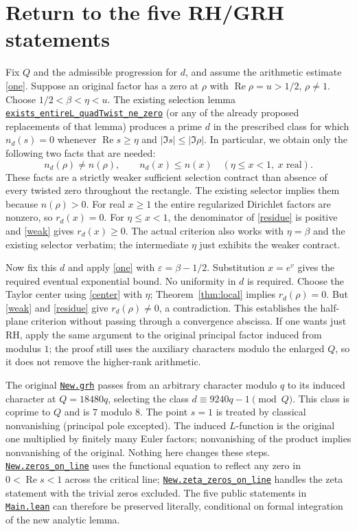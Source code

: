 \documentclass[11pt]{article}
\theoremstyle{remark}\newtheorem{remark}[theorem]{Remark}
\newcommand{\Rea}{\operatorname{Re}}\newcommand{\abs}[1]{\left|#1\right|}
\newcommand{\repo}{https://github.com/VladimirReshetnikov/ProveIt/blob/ef7d441dcb37ea944b7ac15731bb766f2e1354ea/Analysis/GeneralizedRiemannHypothesis/}
\newcommand{\src}[3]{\href{\repo Lean/grh/src/#1.lean\#L#2}{#3}}
\begin{document}
\section{Return to the five RH/GRH statements}\label{sec:grh}
Fix $Q$ and the admissible progression for $d$, and assume the arithmetic estimate \eqref{one}. Suppose an original factor has a zero at $\rho$ with $\Rea\rho=u>1/2$, $\rho\ne1$. Choose $1/2<\beta<\eta<u$. The existing selection lemma \src{Lib/Analytic/QuadraticTwist}{796}{\texttt{exists\_entireL\_quadTwist\_ne\_zero}} (or any of the already proposed replacements of that lemma) produces a prime $d$ in the prescribed class for which $n_d(s)=0$ whenever $\Rea s\ge\eta$ and $|\Im s|\le |\Im\rho|$. In particular, we obtain only the following two facts that are needed:
\begin{equation}\label{weak}
 \boxed{\quad n_d(\rho)\ne n(\rho),\qquad n_d(x)\le n(x)\quad (\eta\le x<1,\ x\text{ real}).\quad}
\end{equation}
These facts are a strictly weaker sufficient selection contract than absence of every twisted zero throughout the rectangle. The existing selector implies them because $n(\rho)>0$. For real $x\ge1$ the entire regularized Dirichlet factors are nonzero, so $r_d(x)=0$. For $\eta\le x<1$, the denominator of \eqref{residue} is positive and \eqref{weak} gives $r_d(x)\ge0$. The actual criterion also works with $\eta=\beta$ and the existing selector verbatim; the intermediate $\eta$ just exhibits the weaker contract.

Now fix this $d$ and apply \eqref{one} with $\varepsilon=\beta-1/2$. Substitution $x=e^v$ gives the required eventual exponential bound. No uniformity in $d$ is required. Choose the Taylor center using \eqref{center} with $\eta$; Theorem~\ref{thm:local} implies $r_d(\rho)=0$. But \eqref{weak} and \eqref{residue} give $r_d(\rho)\ne0$, a contradiction. This establishes the half-plane criterion without passing through a convergence abscissa. If one wants just RH, apply the same argument to the original principal factor induced from modulus $1$; the proof still uses the auxiliary characters modulo the enlarged $Q$, so it does not remove the higher-rank arithmetic.

The original \src{New/Reduction/OneSidedBound}{239}{\texttt{New.grh}} passes from an arbitrary character modulo $q$ to its induced character at $Q=18480q$, selecting the class $d\equiv9240q-1\pmod{Q}$. This class is coprime to $Q$ and is $7$ modulo $8$. The point $s=1$ is treated by classical nonvanishing (principal pole excepted). The induced $L$-function is the original one multiplied by finitely many Euler factors; nonvanishing of the product implies nonvanishing of the original. Nothing here changes these steps. \src{New/Main}{30}{\texttt{New.zeros\_on\_line}} uses the functional equation to reflect any zero in $0<\Rea s<1$ across the critical line; \src{New/Main}{48}{\texttt{New.zeta\_zeros\_on\_line}} handles the zeta statement with the trivial zeros excluded. The five public statements in \src{Main}{5}{\texttt{Main.lean}} can therefore be preserved literally, conditional on formal integration of the new analytic lemma.
\end{document}
